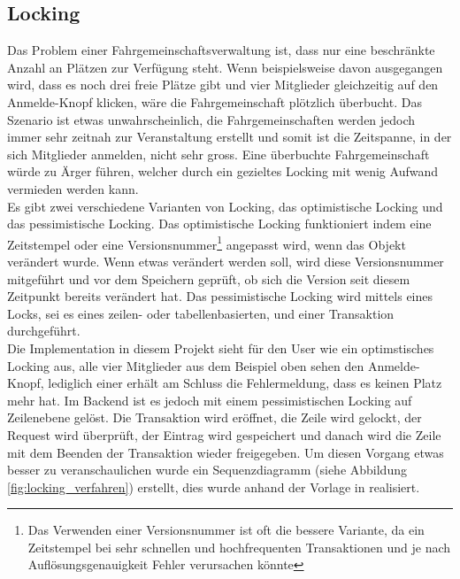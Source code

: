 \subsection{Locking}
Das Problem einer Fahrgemeinschaftsverwaltung ist, dass nur eine beschränkte Anzahl an Plätzen zur Verfügung steht. Wenn beispielsweise davon ausgegangen wird, dass es noch drei freie Plätze gibt und vier Mitglieder gleichzeitig auf den Anmelde-Knopf klicken, wäre die Fahrgemeinschaft plötzlich überbucht. Das Szenario ist etwas unwahrscheinlich, die Fahrgemeinschaften werden jedoch immer sehr zeitnah zur Veranstaltung erstellt und somit ist die Zeitspanne, in der sich Mitglieder anmelden, nicht sehr gross. Eine überbuchte Fahrgemeinschaft würde zu Ärger führen, welcher durch ein gezieltes Locking mit wenig Aufwand vermieden werden kann.\\

Es gibt zwei verschiedene Varianten von Locking, das optimistische Locking und das pessimistische Locking. Das optimistische Locking funktioniert indem eine Zeitstempel oder eine Versionsnummer\footnote{Das Verwenden einer Versionsnummer ist oft die bessere Variante, da ein Zeitstempel bei sehr schnellen und hochfrequenten Transaktionen und je nach Auflösungsgenauigkeit Fehler verursachen könnte} angepasst wird, wenn das Objekt verändert wurde. Wenn etwas verändert werden soll, wird diese Versionsnummer mitgeführt und vor dem Speichern geprüft, ob sich die Version seit diesem Zeitpunkt bereits verändert hat. Das pessimistische Locking wird mittels eines Locks, sei es eines zeilen- oder tabellenbasierten, und einer Transaktion durchgeführt.\\

Die Implementation in diesem Projekt sieht für den User wie ein optimstisches Locking aus, alle vier Mitglieder aus dem Beispiel oben sehen den Anmelde-Knopf, lediglich einer erhält am Schluss die Fehlermeldung, dass es keinen Platz mehr hat. Im Backend ist es jedoch mit einem pessimistischen Locking auf Zeilenebene gelöst. Die Transaktion wird eröffnet, die Zeile wird gelockt, der Request wird überprüft, der Eintrag wird gespeichert und danach wird die Zeile mit dem Beenden der Transaktion wieder freigegeben. Um diesen Vorgang etwas besser zu veranschaulichen wurde ein Sequenzdiagramm (siehe Abbildung \ref{fig:locking_verfahren}) erstellt, dies wurde anhand der Vorlage in \cite{soft_arch_book} realisiert.

